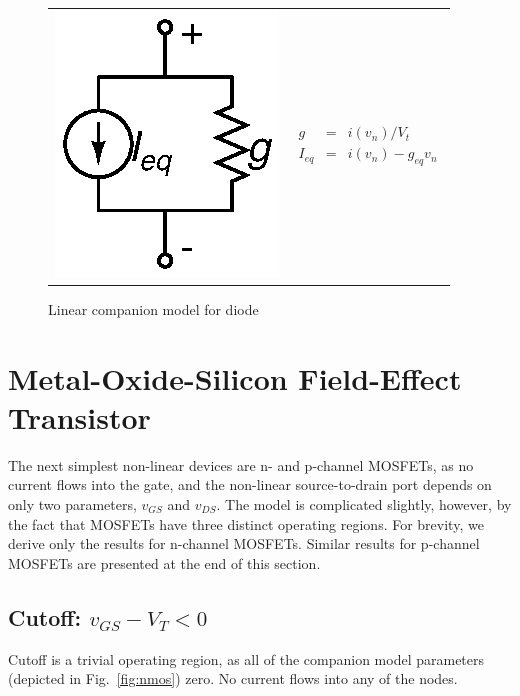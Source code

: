 \documentclass{article}
\begin{document}
\begin{figure}[h]
\begin{center}
\begin{tabular}{m{3cm}<{\centering}m{3cm}<{\centering}}
	\includegraphics{../fig/diode.eps} & 
	\begin{eqnarray*}
		g&=&i(v_n)/V_t \\
		I_{eq}&=&i(v_n)-g_{eq}v_n
	\end{eqnarray*}
\end{tabular}
\caption{Linear companion model for diode \label{fig:diode}}
\end{center}
\end{figure}

\pagebreak

\section{Metal-Oxide-Silicon Field-Effect Transistor}

The next simplest non-linear devices are n- and p-channel MOSFETs, as no current flows into the gate, and the non-linear source-to-drain port depends on only two parameters, $v_{GS}$ and $v_{DS}$.   The model is complicated slightly, however, by the fact that MOSFETs have three distinct operating regions.  For brevity, we derive only the results for n-channel MOSFETs.  Similar results for p-channel MOSFETs are presented at the end of this section.

\subsection{Cutoff: $ v_{GS} - V_T < 0 $ }

Cutoff is a trivial operating region, as all of the companion model parameters (depicted in Fig.~\ref{fig:nmos}) zero.  No current flows into any of the nodes.
\end{document}
